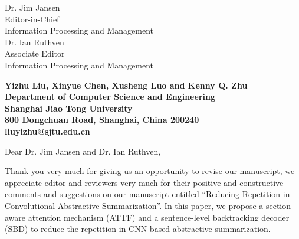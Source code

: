 \documentclass[11pt]{letter} %
\begin{document}

\begin{letter}{Dr. Jim Jansen \\
Editor-in-Chief  \\
Information Processing and Management \\
Dr. Ian Ruthven \\
Associate Editor \\
Information Processing and Management} 


\begin{center}
\large\bf Yizhu Liu, Xinyue Chen, Xusheng Luo and Kenny Q. Zhu \\ %
Department of Computer Science and Engineering \\ Shanghai Jiao Tong University \\ 800 Dongchuan Road, Shanghai, China 200240 \\
liuyizhu@sjtu.edu.cn
\end{center} 
\vfill

\signature{Yizhu Liu, Xinyue Chen, Xusheng Luo and Kenny Q. Zhu} %


\opening{Dear Dr. Jim Jansen and Dr. Ian Ruthven,} 

Thank you very much for giving us an opportunity to revise our manuscript, 
we appreciate editor and reviewers very much for their positive and constructive comments and suggestions 
on our manuscript entitled ``Reducing Repetition in Convolutional Abstractive Summarization''.
In this paper, we propose a section-aware attention mechanism (ATTF) and a sentence-level backtracking decoder (SBD)
to reduce the repetition in CNN-based abstractive summarization.


\end{letter}
\end{document}
